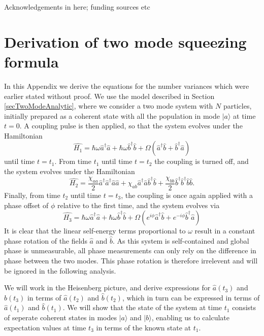 \documentclass[12pt]{iopart}
\begin{document}
\ack
Acknowledgements in here; funding sources etc

\clearpage

\appendix
\section{Derivation of two mode squeezing formula}
\label{appendixTwoModeDerivation}
In this Appendix we derive the equations for the number variances which were earlier stated without proof. We use the model described in Section \ref{secTwoModeAnalytic}, where we consider a two mode system with $N$ particles, initially prepared as a coherent state with all the population in mode $|a\rangle$ at time $t=0$. A coupling pulse is then applied, so that the system evolves under the Hamiltonian
\begin{equation}
\hat{H_1} = \hbar \omega \hat{a}^{\dagger} \hat{a} +  \hbar \omega \hat{b}^{\dagger} \hat{b} 
          + \Omega (\hat{a}^{\dagger} \hat{b} + \hat{b}^{\dagger} \hat{a} )
\end{equation}
until time $t=t_1$. From time $t_1$ until time $t=t_2$ the coupling is turned off, and the system evolves under the Hamiltonian
\begin{equation}
\hat{H_2} = \frac{\chi_{aa}}{2} \hat{a}^{\dagger} \hat{a}^{\dagger} \hat{a} \hat{a}
          + \chi_{ab} \hat{a}^{\dagger} \hat{a} \hat{b}^{\dagger} \hat{b}
          + \frac{\chi_{bb}}{2} \hat{b}^{\dagger} \hat{b}^{\dagger} \hat{b} \hat{b}.
\end{equation}
Finally, from time $t_2$ until time $t=t_3$, the coupling is once again applied with a phase offset of $\phi$ relative to the first time, and the system evolves via
\begin{equation}
\hat{H_3} = \hbar \omega \hat{a}^{\dagger} \hat{a} +  \hbar \omega \hat{b}^{\dagger} \hat{b}
          + \Omega (e^{i\phi} \hat{a}^{\dagger} \hat{b} + e^{-i\phi} \hat{b}^{\dagger} \hat{a} )
\end{equation}
It is clear that the linear self-energy terms proportional to $\omega$ result in a constant phase rotation of the fields $\hat{a}$ and $\hat{b}$. As this system is self-contained and global phase is unmeasurable, all phase measurements can only rely on the difference in phase between the two modes. This phase rotation is therefore irrelevent and will be ignored in the following analysis.

We will work in the Heisenberg picture, and derive expressions for $\hat{a}(t_3)$ and $\hat{b}(t_3)$ in terms of $\hat{a}(t_2)$ and $\hat{b}(t_2)$, which in turn can be expressed in terms of $\hat{a}(t_1)$ and $\hat{b}(t_1)$. We will show that the state of the system at time $t_1$ consists of seperate coherent states in modes $|a\rangle$ and $|b\rangle$, enabling us to calculate expectation values at time $t_3$ in terms of the known state at $t_1$.
\end{document}
